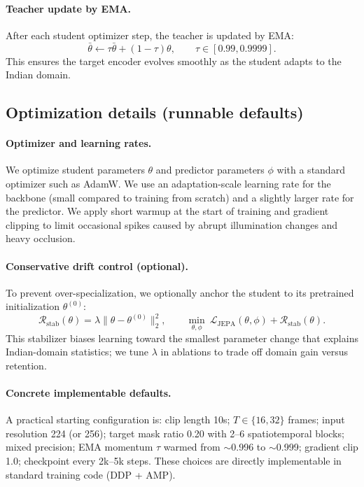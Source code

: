 \paragraph{Teacher update by EMA.} After each student optimizer step, the teacher is updated by EMA:
\[
\bar{\theta}\leftarrow \tau\bar{\theta}+(1-\tau)\theta,
\qquad \tau\in[0.99,0.9999].
\]
This ensures the target encoder evolves smoothly as the student adapts to the Indian domain.

\subsection{Optimization details (runnable defaults)}\label{sec:ctp_optim}
\paragraph{Optimizer and learning rates.} We optimize student parameters $\theta$ and predictor parameters $\phi$ with a standard optimizer such as AdamW. We use an adaptation-scale learning rate for the backbone (small compared to training from scratch) and a slightly larger rate for the predictor. We apply short warmup at the start of training and gradient clipping to limit occasional spikes caused by abrupt illumination changes and heavy occlusion.
\paragraph{Conservative drift control (optional).} To prevent over-specialization, we optionally anchor the student to its pretrained initialization $\theta^{(0)}$:
\[
\mathcal{R}_{\mathrm{stab}}(\theta)=\lambda\|\theta-\theta^{(0)}\|_2^2,
\qquad
\min_{\theta,\phi}\ \mathcal{L}_{\mathrm{JEPA}}(\theta,\phi)+\mathcal{R}_{\mathrm{stab}}(\theta).
\]
This stabilizer biases learning toward the smallest parameter change that explains Indian-domain statistics; we tune $\lambda$ in ablations to trade off domain gain versus retention.
\paragraph{Concrete implementable defaults.} A practical starting configuration is: clip length 10s; $T\in\{16,32\}$ frames; input resolution 224 (or 256); target mask ratio 0.20 with 2--6 spatiotemporal blocks; mixed precision; EMA momentum $\tau$ warmed from $\sim$0.996 to $\sim$0.999; gradient clip 1.0; checkpoint every 2k--5k steps. These choices are directly implementable in standard training code (DDP + AMP).

